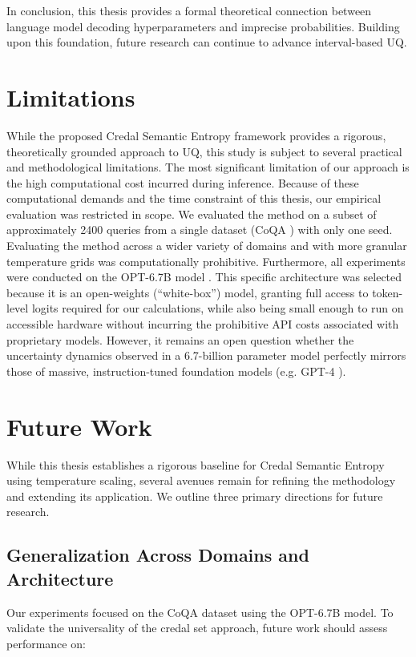 In conclusion, this thesis provides a formal theoretical 
connection between language model decoding hyperparameters and
imprecise probabilities. Building upon this foundation,
future research can continue to advance interval-based 
UQ.


\section{Limitations}
\label{sec:conclusion:limitations}
While the proposed Credal Semantic Entropy framework provides a rigorous,
theoretically grounded approach to UQ,
this study is
subject to several practical and methodological limitations.
The most significant limitation of our approach is the high computational
cost incurred during inference.
Because of these computational demands and the time constraint of this 
thesis, our empirical evaluation was restricted in scope. We evaluated the
method on a subset of approximately 2400 queries from a single dataset 
(CoQA \parencite{guo2021abgcoqa}) with only one seed. 
Evaluating the method across a wider 
variety of domains and with
more granular temperature grids was computationally prohibitive.
Furthermore, all experiments were conducted on the OPT-6.7B
model \parencite{zhang2022opt}. This
specific architecture was selected because it is an open-weights 
(``white-box'') model, granting full access to token-level logits required 
for our calculations, while also being small enough to run on accessible 
hardware without incurring the prohibitive API costs associated with
proprietary models. However, it remains an open question whether the
uncertainty dynamics observed in a 6.7-billion parameter model perfectly
mirrors those of massive, instruction-tuned foundation models (e.g. GPT-4
\parencite{openai2024gpt4technicalreport}).


\section{Future Work}
\label{sec:conclusion:future}
While this thesis establishes a rigorous baseline for Credal Semantic 
Entropy using temperature scaling, several avenues remain for refining 
the methodology and extending its application. We outline three primary
directions for future research.

\subsection{Generalization Across Domains and Architecture}
\label{sec:conclusion:future:generalization}
Our experiments focused on the CoQA dataset using the OPT-6.7B model.
To validate the universality of the credal set approach, future work
should assess performance on:

